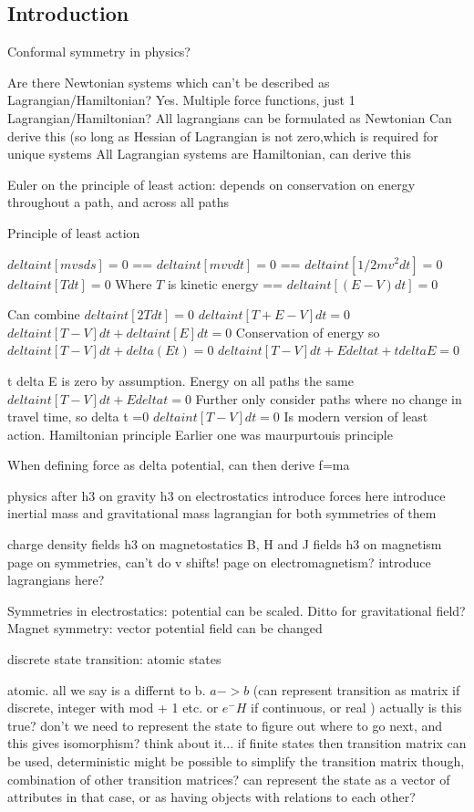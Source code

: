 
\subsection{Introduction}

Conformal symmetry in physics?

Are there Newtonian systems which can't be described as Lagrangian/Hamiltonian? Yes. Multiple force functions, just 1 Lagrangian/Hamiltonian?
All lagrangians can be formulated as Newtonian
Can derive this (so long as Hessian of Lagrangian is not zero,which is required for unique systems
All Lagrangian systems are Hamiltonian, can derive this


Euler on the principle of least action: depends on conservation on energy throughout a path, and across all paths

Principle of least action

\(delta int [mvs ds]=0\)
==
\(delta int [mvv dt] =0\)
==
\(delta int [1/2 mv^2 dt]=0\)
\(delta int [T dt] =0\)
Where \(T\) is kinetic energy
==
\(delta int [(E-V) dt] =0\)

Can combine
\(delta int [2T dt]=0\)
\(delta int [T+E-V]dt=0\)
\(delta int [T-V] dt + delta int [E] dt=0\)
Conservation of energy so
\(delta int [T-V] dt + delta (Et) =0\)
\(delta int [T-V] dt + E delta t + t delta E =0\)

t delta E is zero by assumption. Energy on all paths the same
\(delta int [T-V] dt + E delta t =0\)
Further only consider paths where no change in travel time, so delta t =0
\(delta int [T-V] dt =0\)
Is modern version of least action. Hamiltonian principle
Earlier one was maurpurtouis principle

When defining force as delta potential, can then derive f=ma

physics
	after h3 on gravity
		h3 on electrostatics
			introduce forces here
			introduce inertial mass and gravitational mass
			lagrangian for both
			symmetries of them

			charge density fields
		h3 on magnetostatics
			B, H and J fields
		h3 on magnetism
			page on symmetries, can't do v shifts!
			page on electromagnetism?
			introduce lagrangians here?

Symmetries in electrostatics: potential can be scaled. Ditto for gravitational field?
Magnet symmetry: vector potential field can be changed


discrete state transition: atomic states

atomic. all we say is a differnt to b. \(a->b\) (can represent transition as matrix if discrete, integer with mod + 1 etc. or \(e^-H\) if continuous, or real )
 actually is this true? don't we need to represent the state to figure out where to go next, and this gives isomorphism? think about it...
 if finite states then transition matrix can be used, deterministic
 might be possible to simplify the transition matrix though, combination of other transition matrices? can represent the state as a vector of attributes in that case, or as having objects with relations to each other?



